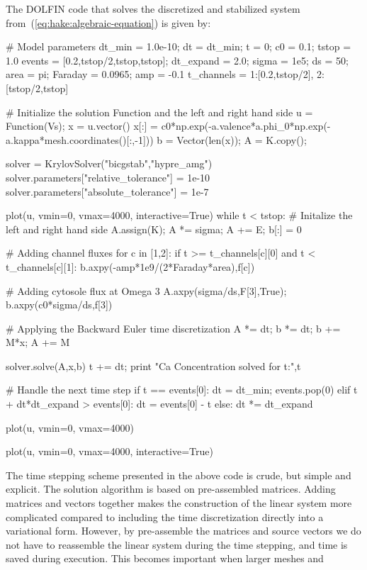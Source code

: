 The DOLFIN code that solves the discretized and stabilized system
from~(\ref{eq:hake:algebraic-equation}) is given by:
\begin{python}
# Model parameters
dt_min = 1.0e-10; dt = dt_min; t = 0; c0 = 0.1; tstop = 1.0
events = [0.2,tstop/2,tstop,tstop]; dt_expand = 2.0;
sigma = 1e5; ds = 50; area = pi; Faraday = 0.0965; amp = -0.1
t_channels = {1:[0.2,tstop/2], 2:[tstop/2,tstop]}

# Initialize the solution Function and the left and right hand side
u = Function(Vs); x = u.vector()
x[:] = c0*np.exp(-a.valence*a.phi_0*np.exp(-a.kappa*mesh.coordinates()[:,-1]))
b = Vector(len(x)); A = K.copy();

solver = KrylovSolver("bicgstab","hypre_amg")
solver.parameters["relative_tolerance"] = 1e-10
solver.parameters["absolute_tolerance"] = 1e-7

plot(u, vmin=0, vmax=4000, interactive=True)
while t < tstop:
    # Initalize the left and right hand side
    A.assign(K); A *= sigma; A += E; b[:] = 0

    # Adding channel fluxes
    for c in [1,2]:
        if t >= t_channels[c][0] and t < t_channels[c][1]:
            b.axpy(-amp*1e9/(2*Faraday*area),f[c])

    # Adding cytosole flux at Omega 3
    A.axpy(sigma/ds,F[3],True); b.axpy(c0*sigma/ds,f[3])

    # Applying the Backward Euler time discretization
    A *= dt; b *= dt; b += M*x; A += M

    solver.solve(A,x,b)
    t += dt; print "Ca Concentration solved for t:",t

    # Handle the next time step
    if t == events[0]:
        dt = dt_min; events.pop(0)
    elif t + dt*dt_expand > events[0]:
        dt = events[0] - t
    else:
        dt *= dt_expand

    plot(u, vmin=0, vmax=4000)

plot(u, vmin=0, vmax=4000, interactive=True)
\end{python}
The time stepping scheme presented in the above code is crude, but
simple and explicit. The solution algorithm is based on pre-assembled
matrices. Adding matrices and vectors together makes the construction
of the linear system more complicated compared to including the time
discretization directly into a variational form. However, by
pre-assemble the matrices and source vectors we do not have to
reassemble the linear system during the time stepping, and time is
saved during execution. This becomes important when larger meshes and
